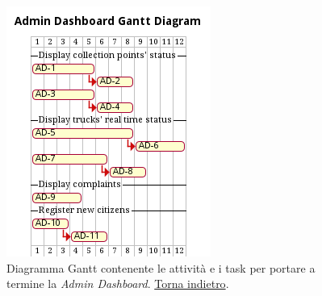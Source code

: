 \begin{figure}[H]
    \centering
    \includegraphics[width=\textwidth]{uml/gantt-admin-dashboard.pm}
    \caption{Diagramma Gantt contenente le attività e i task per portare a termine la \textit{Admin Dashboard}. \hyperlink{back:uml/gantt-admin-dashboard}{Torna indietro}.}
    \label{fig:uml/gantt-admin-dashboard}
\end{figure}


